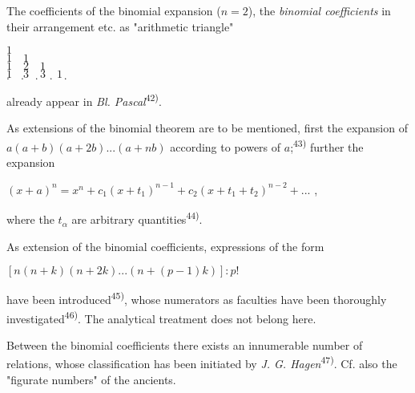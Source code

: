 \thispagestyle{fancy}

\vspace{0.5cm}

The coefficients of the binomial expansion ($n=2$), the \textit{binomial coefficients} in their arrangement etc. as "arithmetic triangle"

\vspace{-0.3cm}
\begin{center}
    $1$\\[-1pt]
    
    $1 \quad 1$\\[-1pt]
    
    $1 \quad 2 \quad 1$\\[-1pt]
    
    $1 \quad 3 \quad 3 \quad 1$\\[-1pt]
    
    $. \quad . \quad . \quad . \quad .$\\[-1pt]
\end{center}
\vspace{-0.1cm}

already appear in \textit{Bl. Pascal}\textsuperscript{42)}.

As extensions of the binomial theorem are to be mentioned, first the expansion of $a(a+b)(a+2b)...(a+nb)$ according to powers of $a$;\textsuperscript{43)} further the expansion

\vspace{-0.5cm}
\begin{center}
    $(x+a)^n = x^n + c_1(x+t_1)^{n-1} + c_2(x+t_1+t_2)^{n-2} + ...$ , 
\end{center}
\vspace{-0.2cm}

where the $t_\alpha$ are arbitrary quantities\textsuperscript{44)}. 

As extension of the binomial coefficients, expressions of the form 

\vspace{-0.1cm}
\begin{center}
    $[n(n+k)(n+2k)...(n+(p-1)k)]:p!$ 
\end{center}
\vspace{-0.1cm}

have been introduced\textsuperscript{45)}, whose numerators as faculties have been thoroughly investigated\textsuperscript{46)}. The analytical treatment does not belong here. 

Between the binomial coefficients there exists an innumerable number of relations, whose classification has been initiated by \textit{J. G. Hagen}\textsuperscript{47)}. Cf. also the "figurate numbers" of the ancients.

